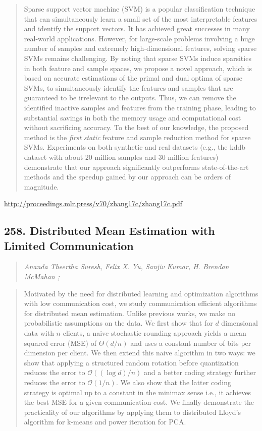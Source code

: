 \documentclass{article}
\begin{document}
\begin{quote}
    Sparse support vector machine (SVM) is a popular classification technique that can simultaneously learn a small set of the most interpretable features and identify the support vectors. It has achieved great successes in many real-world applications. However, for large-scale problems involving a huge number of samples and extremely high-dimensional features, solving sparse SVMs remains challenging. By noting that sparse SVMs induce sparsities in both feature and sample spaces, we propose a novel approach, which is based on accurate estimations of the primal and dual optima of sparse SVMs, to simultaneously identify the features and samples that are guaranteed to be irrelevant to the outputs. Thus, we can remove the identified inactive samples and features from the training phase, leading to substantial savings in both the memory usage and computational cost without sacrificing accuracy. To the best of our knowledge, the proposed method is the \textit{first} \textit{static} feature and sample reduction method for sparse SVMs. Experiments on both synthetic and real datasets (e.g., the kddb dataset with about 20 million samples and 30 million features) demonstrate that our approach significantly outperforms state-of-the-art methods and the speedup gained by our approach can be orders of magnitude.  
\end{quote}

\href{http://proceedings.mlr.press/v70/zhang17c/zhang17c.pdf}{http://proceedings.mlr.press/v70/zhang17c/zhang17c.pdf}

\subsection{258. Distributed Mean Estimation with Limited Communication}

\begin{quote}
\footnotesize{\textit{Ananda Theertha Suresh, Felix X. Yu, Sanjiv Kumar, H. Brendan McMahan ;}}

\end{quote}

\begin{quote}
    Motivated by the need for distributed learning and optimization algorithms with low communication cost, we study communication efficient algorithms for distributed mean estimation. Unlike previous works, we make no probabilistic assumptions on the data. We first show that for $d$ dimensional data with $n$ clients, a naive stochastic rounding approach yields a mean squared error (MSE) of $\Theta(d/n)$ and uses a constant number of bits per dimension per client. We then extend this naive algorithm in two ways: we show that applying a structured random rotation before quantization reduces the error to $\mathcal{O}((\log d)/n)$ and a better coding strategy further reduces the error to $\mathcal{O}(1/n)$. We also show that the latter coding strategy is optimal up to a constant in the minimax sense i.e., it achieves the best MSE for a given communication cost. We finally demonstrate the practicality of our algorithms by applying them to distributed Lloyd’s algorithm for k-means and power iteration for PCA.  
\end{quote}
\end{document}
